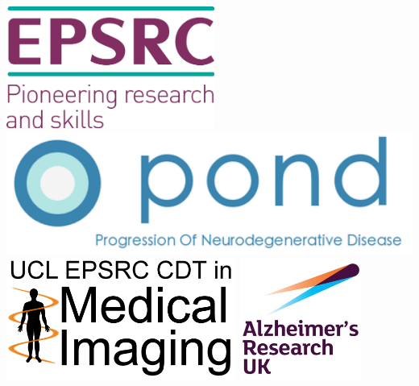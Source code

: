 \documentclass[portrait,a0,final,20pt]{a0poster}
\begin{document}
\begin{multicols}{2}
\vspace{1em}
\includegraphics[height=4.0cm]{epsrc_logo.jpg}
\hspace{0.5em}
\includegraphics[height=4.0cm]{pondLogo.png} 
\hspace{0.5em}
\includegraphics[height=4cm]{cdt_logo.png} 
\hspace{0.5em}
\includegraphics[height=4cm]{aruk_logo} 


\end{multicols}
\end{document}
